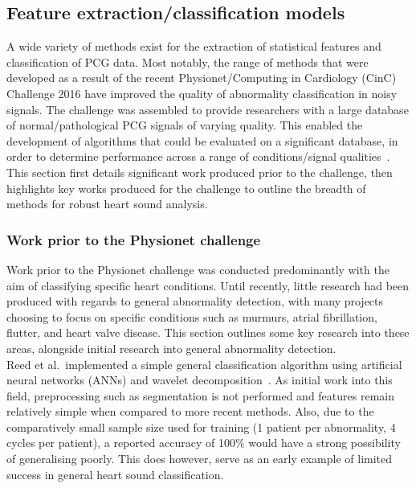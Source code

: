 \documentclass[titlepage, 12pt]{scrartcl} \usepackage{enumitem}
\begin{document}
\doublespacing

\subsection{Feature extraction/classification models}\label{Classification}

A wide variety of methods exist for the extraction of statistical features and
classification of PCG data. Most notably, the range of methods that were
developed as a result of the recent Physionet/Computing in Cardiology (CinC)
Challenge 2016 have improved the quality of abnormality classification in
noisy signals. The challenge was assembled to provide researchers with a large
database of normal/pathological PCG signals of varying quality. This enabled
the development of algorithms that could be evaluated on a significant
database, in order to determine performance across a range of conditions/signal
qualities~\parencite{Clifford2016}. This section first details significant work
produced prior to the challenge, then highlights key works produced for the
challenge to outline the breadth of methods for robust heart sound analysis.

\subsubsection{Work prior to the Physionet challenge}
Work prior to the Physionet challenge was conducted predominantly with the aim
of classifying specific heart conditions. Until recently, little research had
been produced with regards to general abnormality detection, with many projects
choosing to focus on specific conditions such as murmurs, atrial fibrillation,
flutter, and heart valve disease. This section outlines some key research
into these areas, alongside initial research into general abnormality
detection.\\

Reed et al.\ implemented a simple general classification algorithm using
artificial neural networks (ANNs) and wavelet
decomposition~\parencite{Reed2004}. As initial work into this field,
preprocessing such as segmentation is not performed and features remain
relatively simple when compared to more recent methods. Also, due to the
comparatively small sample size used for training (1 patient per abnormality, 4
cycles per patient), a reported accuracy of 100\% would have a strong
possibility of generalising poorly. This does however, serve as an early
example of limited success in general heart sound classification.\\
\end{document}

